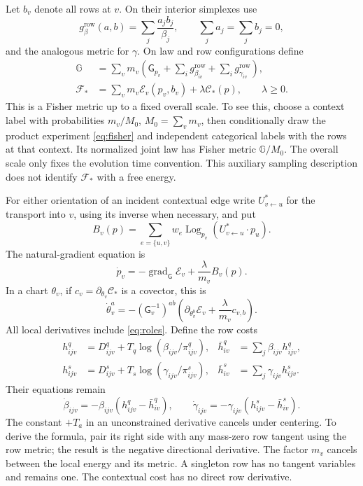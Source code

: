 \documentclass[11pt]{article}
\DeclareMathOperator{\grad}{grad}
\DeclareMathOperator{\Log}{Log}
\newcommand{\G}{\mathsf G}
\begin{document}
Let $b_v$ denote all rows at $v$. On their interior simplexes use
\begin{equation}
 g^{\mathrm{row}}_\beta(a,b)=\sum_j\frac{a_jb_j}{\beta_j},
 \qquad \sum_j a_j=\sum_j b_j=0,
\end{equation}
and the analogous metric for $\gamma$. On law and row configurations define
\begin{align}
 \mathbb G&=\sum_v m_v\left(\G_{p_v}+\sum_i g^{\mathrm{row}}_{\beta_{iv}}
                                  +\sum_i g^{\mathrm{row}}_{\gamma_{iv}}\right),\\
 \mathcal F_*&=\sum_v m_v\mathcal E_v(p_v,b_v)+\lambda\mathcal C_*(p),
 \qquad \lambda\geq0.
 \label{eq:F}
\end{align}
This is a Fisher metric up to a fixed overall scale. To see this, choose a context label with probabilities $m_v/M_0$, $M_0=\sum_vm_v$, then conditionally draw the product experiment \eqref{eq:fisher} and independent categorical labels with the rows at that context. Its normalized joint law has Fisher metric $\mathbb G/M_0$. The overall scale only fixes the evolution time convention. This auxiliary sampling description does not identify $\mathcal F_*$ with a free energy.

For either orientation of an incident contextual edge write $U^*_{v\leftarrow u}$ for the transport into $v$, using its inverse when necessary, and put
\begin{equation}
 B_v(p)=\sum_{e=\{u,v\}}w_e\Log_{p_v}(U^*_{v\leftarrow u}\cdot p_u).
 \label{eq:B}
\end{equation}
The natural-gradient equation \cite{Amari1998} is
\begin{equation}
 \boxed{\dot p_v=-\grad_{\G}\mathcal E_v+\frac{\lambda}{m_v}B_v(p).}
 \label{eq:flow}
\end{equation}
In a chart $\theta_v$, if $c_v=\partial_{\theta_v}\mathcal C_*$ is a covector, this is
\begin{equation}
 \dot\theta_v^a=-(\G_v^{-1})^{ab}
 \left(\partial_{\theta_v^b}\mathcal E_v+\frac{\lambda}{m_v}c_{v,b}\right).
\end{equation}
All local derivatives include \eqref{eq:roles}. Define the row costs
\begin{align}
 h^q_{ijv}&=D^q_{ijv}+T_q\log(\beta_{ijv}/\pi^q_{ijv}),&
 \bar h^q_{iv}&=\sum_j\beta_{ijv}h^q_{ijv},\\
 h^s_{ijv}&=D^s_{ijv}+T_s\log(\gamma_{ijv}/\pi^s_{ijv}),&
 \bar h^s_{iv}&=\sum_j\gamma_{ijv}h^s_{ijv}.
\end{align}
Their equations remain
\begin{equation}
 \dot\beta_{ijv}=-\beta_{ijv}(h^q_{ijv}-\bar h^q_{iv}),\qquad
 \dot\gamma_{ijv}=-\gamma_{ijv}(h^s_{ijv}-\bar h^s_{iv}).
 \label{eq:rowflow}
\end{equation}
The constant $+T_a$ in an unconstrained derivative cancels under centering. To derive the formula, pair its right side with any mass-zero row tangent using the row metric; the result is the negative directional derivative. The factor $m_v$ cancels between the local energy and its metric. A singleton row has no tangent variables and remains one. The contextual cost has no direct row derivative.
\end{document}
